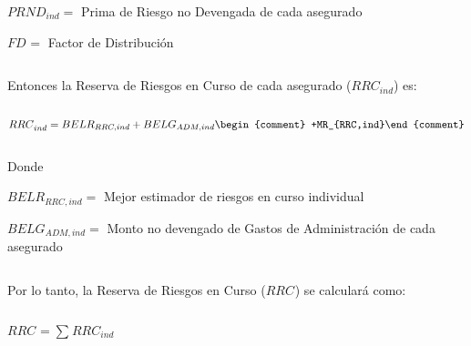 \documentclass[11pt,twoside,openright,spanish]{report}
\numberwithin{equation}{chapter}
\numberwithin{figure}{chapter}
\numberwithin{table}{chapter}
\begin{document}
	
	$PRND_{ind}=$ Prima de Riesgo no Devengada de cada asegurado
	
	$FD_{}^{}=$ Factor de Distribución
	
		\begin{comment}
	$PTND_{ind}=$ Prima de Tarifa no Devengada de cada asegurado
	

	$FS_{BEL}^{RRC}=$ Factor de Siniestralidad última con información de mercado
	\end{comment}
	
	 

$ $

 
	
	Entonces la Reserva de Riesgos en Curso de cada asegurado ($RRC_{ind}$) es:
	
	 

$ $

 
	
	{\centering
		${RRC}_{ind}^{}={{BELR}_{RRC,ind}+BELG_{ADM,ind} \begin{comment} +MR_{RRC,ind}\end{comment}
		}$
			
			
			
		\noindent
		
	}	
	
	
	 

$ $

 
	
	Donde
	
	 
	
	$BELR_{RRC,ind}=$ Mejor estimador de riesgos en curso individual
	
	$BELG_{ADM,ind}^{}=$ Monto no devengado de Gastos de Administración de cada asegurado
	
	\begin{comment}
	$MR_{RRC,ind}^{}=$ Margen de Riesgo de la reserva de riesgos en curso calculado anteriormente
	\end{comment}
	
	 

$ $

 
	
	Por lo tanto, la Reserva de Riesgos en Curso ($RRC_{}$) se calculará como:
	
	 

$ $

 
	
	
	{\centering
		$RRC_{}={\sum _{}^{}RRC_{ind}^{}}$
		
		\noindent
		
	}	
	
	
	 
\end{document}
